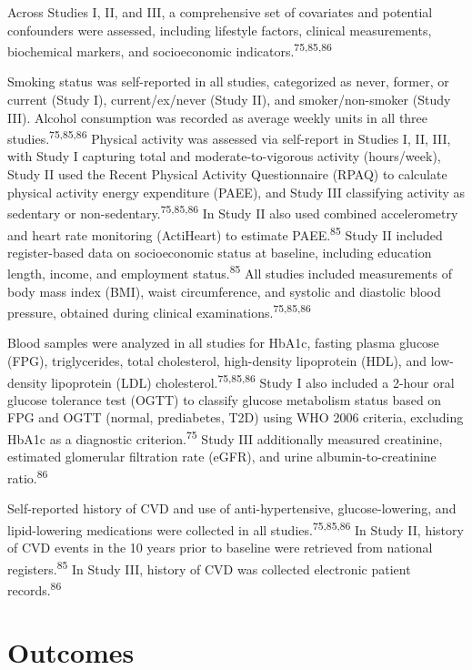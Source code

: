\documentclass[
  letterpaper,
  headsepline=true,
  open=any]{scrbook}
\begin{document}
Across Studies I, II, and III, a comprehensive set of covariates and
potential confounders were assessed, including lifestyle factors,
clinical measurements, biochemical markers, and socioeconomic
indicators.\textsuperscript{75,85,86}

Smoking status was self-reported in all studies, categorized as never,
former, or current (Study I), current/ex/never (Study II), and
smoker/non-smoker (Study III). Alcohol consumption was recorded as
average weekly units in all three studies.\textsuperscript{75,85,86}
Physical activity was assessed via self-report in Studies I, II, III,
with Study I capturing total and moderate-to-vigorous activity
(hours/week), Study II used the Recent Physical Activity Questionnaire
(RPAQ) to calculate physical activity energy expenditure (PAEE), and
Study III classifying activity as sedentary or
non-sedentary.\textsuperscript{75,85,86} In Study II also used combined
accelerometry and heart rate monitoring (ActiHeart) to estimate
PAEE.\textsuperscript{85} Study II included register-based data on
socioeconomic status at baseline, including education length, income,
and employment status.\textsuperscript{85} All studies included
measurements of body mass index (BMI), waist circumference, and systolic
and diastolic blood pressure, obtained during clinical
examinations.\textsuperscript{75,85,86}

Blood samples were analyzed in all studies for HbA1c, fasting plasma
glucose (FPG), triglycerides, total cholesterol, high-density
lipoprotein (HDL), and low-density lipoprotein (LDL)
cholesterol.\textsuperscript{75,85,86} Study I also included a 2-hour
oral glucose tolerance test (OGTT) to classify glucose metabolism status
based on FPG and OGTT (normal, prediabetes, T2D) using WHO 2006
criteria, excluding HbA1c as a diagnostic criterion.\textsuperscript{75}
Study III additionally measured creatinine, estimated glomerular
filtration rate (eGFR), and urine albumin-to-creatinine
ratio.\textsuperscript{86}

Self-reported history of CVD and use of anti-hypertensive,
glucose-lowering, and lipid-lowering medications were collected in all
studies.\textsuperscript{75,85,86} In Study II, history of CVD events in
the 10 years prior to baseline were retrieved from national
registers.\textsuperscript{85} In Study III, history of CVD was
collected electronic patient records.\textsuperscript{86}

\hypertarget{outcomes}{%
\section{Outcomes}\label{outcomes}}
\end{document}
